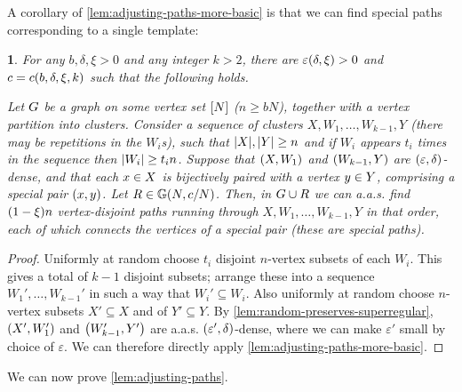 \documentclass[11pt,english]{article}
\theoremstyle{plain}
\theoremstyle{plain}
\newtheorem{cor}[thm]{\protect\corollaryname}
\theoremstyle{plain}
\theoremstyle{plain}
\theoremstyle{plain}
\theoremstyle{definition}
\theoremstyle{definition}
\theoremstyle{remark}
\theoremstyle{remark}
\theoremstyle{plain}
\theoremstyle{definition}
\theoremstyle{definition}
\theoremstyle{plain}
\theoremstyle{plain}
\newtheorem{mycor}[mythm]{\protect\corollaryname}
\renewenvironment{cor}{\begin{mycor}}{\end{mycor}}
\theoremstyle{plain}
\theoremstyle{plain}
\theoremstyle{remark}
\theoremstyle{plain}
\theoremstyle{definition}
\let\originalleft\left
\let\originalright\right
\renewcommand{\left}{\mathopen{}\mathclose\bgroup\originalleft}
\renewcommand{\right}{\aftergroup\egroup\originalright}
\providecommand{\corollaryname}{Corollary}
\begin{document}
A corollary of \ref{lem:adjusting-paths-more-basic} is that we can
find special paths corresponding to a single template:
\begin{cor}
\label{cor:adjusting-paths-basic}For any $b,\delta,\xi>0$ and any
integer $k>2$, there are $\varepsilon\left(\delta,\xi\right)>0$
and $\c=\c\left(b,\delta,\xi,k\right)$ such that the following holds.

Let $G$ be a graph on some vertex set $\range N$ ($n\ge bN$),
together with a vertex partition into clusters. Consider a sequence
of clusters $X,W_{1},\dots,W_{k-1},Y$ (there may be repetitions in
the $W_{i}$s), such that $\left|X\right|,\left|Y\right|\ge n$ and
if $W_{i}$ appears $t_{i}$ times in the sequence then $\left|W_{i}\right|\ge t_{i}n$.
Suppose that $\left(X,W_{1}\right)$ and $\left(W_{k-1},Y\right)$
are $\left(\varepsilon,\delta\right)$-dense, and that each $x\in X$
is bijectively paired with a vertex $y\in Y$, comprising a \emph{special
pair} $\left(\x,\y\right)$. Let $\R\in\GG\left(N,\c/N\right)$. Then,
in $G\cup R$ we can a.a.s. find $\left(1-\xi\right)n$ vertex-disjoint
paths running through $X,W_{1},\dots,W_{k-1},Y$ in that order, each
of which connects the vertices of a special pair (these are \emph{special
paths}).\end{cor}
\begin{proof}
Uniformly at random choose $t_{i}$ disjoint $n$-vertex subsets of
each $W_{i}$. This gives a total of $k-1$ disjoint subsets; arrange
these into a sequence $W_{1}',\dots,W_{k-1}'$ in such a way that
$W_{i}'\subseteq W_{i}$. Also uniformly at random choose $n$-vertex
subsets $X'\subseteq X$ and of $Y'\subseteq Y$. By \ref{lem:random-preserves-superregular},
$\left(X',W_{1}'\right)$ and $\left(W_{k-1}',Y'\right)$ are a.a.s.
$\left(\varepsilon',\delta\right)$-dense, where we can make $\varepsilon'$
small by choice of $\varepsilon$. We can therefore directly apply
\ref{lem:adjusting-paths-more-basic}.
\end{proof}
We can now prove \ref{lem:adjusting-paths}.
\end{document}
